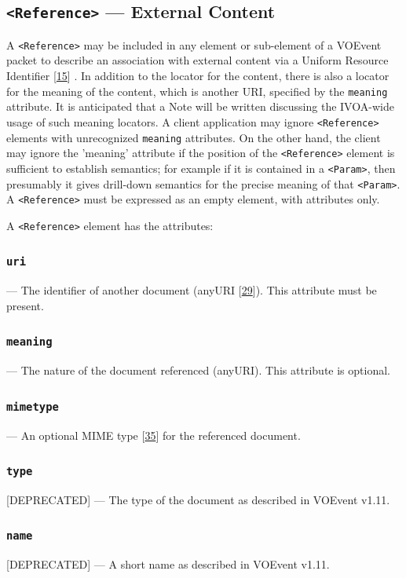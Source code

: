 \documentclass[11pt,a4paper]{ivoa}
\begin{document}
\subsection{{\tt <Reference>} --- External Content}
\label{sec:3.9}
A {\tt <Reference>} may be included in any element or sub-element of a VOEvent packet to describe an association with external content via a Uniform Resource Identifier [\hyperref[bib15]{15}]
. In addition to the locator for the content, there is also a locator for the meaning of the content, which is another URI, specified by the {\tt meaning} attribute. It is anticipated that a Note will be written discussing the IVOA-wide usage of such meaning locators. A client application may ignore {\tt <Reference>} elements with unrecognized {\tt meaning} attributes. On the other hand, the client may ignore the 'meaning' attribute if the position of the {\tt <Reference>} element is sufficient to establish semantics; for example if it is contained in a {\tt <Param>}, then presumably it gives drill-down semantics for the precise meaning of that {\tt <Param>}. A {\tt <Reference>} must be expressed as an empty element, with attributes only. 

A {\tt <Reference>} element has the attributes: 
\subsubsection{\tt uri}\label{sec:3.9.1}--- The identifier of another document (anyURI [\hyperref[bib29]{29}]). This attribute must be present. 
\subsubsection{\tt meaning}\label{sec:3.9.2}--- The nature of the document referenced (anyURI). This attribute is optional. 
\subsubsection{\tt mimetype}\label{sec:3.9.3}--- An optional MIME type [\hyperref[bib35]{35}] for the referenced document. 
\subsubsection{\tt type}\label{sec:3.9.4}[DEPRECATED] --- The type of the document as described in VOEvent v1.11. 
\subsubsection{\tt name}\label{sec:3.9.5}[DEPRECATED] --- A short name as described in VOEvent v1.11. 
\end{document}
